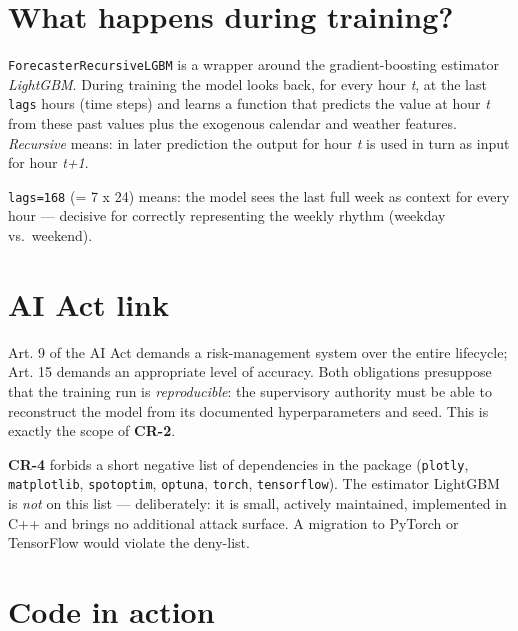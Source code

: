 \documentclass[
  english,
  letterpaper,
]{scrbook}
\begin{document}
\section{What happens during
training?}\label{what-happens-during-training}

\texttt{ForecasterRecursiveLGBM} is a wrapper around the
gradient-boosting estimator \emph{LightGBM}. During training the model
looks back, for every hour \emph{t}, at the last \texttt{lags} hours
(time steps) and learns a function that predicts the value at hour
\emph{t} from these past values plus the exogenous calendar and weather
features. \emph{Recursive} means: in later prediction the output for
hour \emph{t} is used in turn as input for hour \emph{t+1}.

\texttt{lags=168} (= 7 x 24) means: the model sees the last full week as
context for every hour --- decisive for correctly representing the
weekly rhythm (weekday vs.~weekend).

\section{AI Act link}\label{ai-act-link-3}

Art. 9 of the AI Act demands a risk-management system over the entire
lifecycle; Art. 15 demands an appropriate level of accuracy. Both
obligations presuppose that the training run is \emph{reproducible}: the
supervisory authority must be able to reconstruct the model from its
documented hyperparameters and seed. This is exactly the scope of
\textbf{CR-2}.

\textbf{CR-4} forbids a short negative list of dependencies in the
package (\texttt{plotly}, \texttt{matplotlib}, \texttt{spotoptim},
\texttt{optuna}, \texttt{torch}, \texttt{tensorflow}). The estimator
LightGBM is \emph{not} on this list --- deliberately: it is small,
actively maintained, implemented in C++ and brings no additional attack
surface. A migration to PyTorch or TensorFlow would violate the
deny-list.

\section{Code in action}\label{code-in-action-3}
\end{document}
